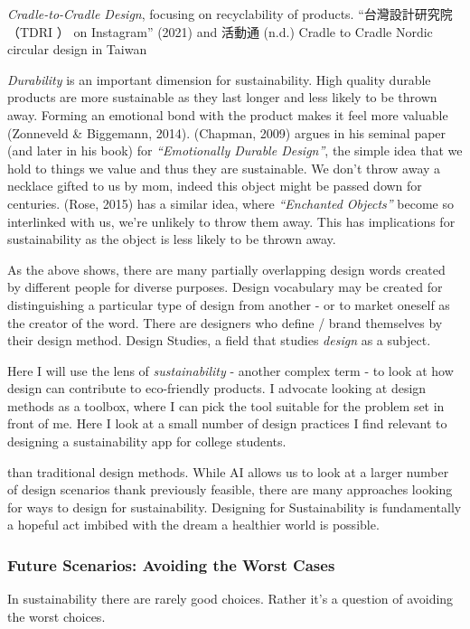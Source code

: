 \documentclass[
  letterpaper,
  DIV=11,
  numbers=noendperiod]{scrartcl}
\begin{document}
\emph{Cradle-to-Cradle Design}, focusing on recyclability of products.
{``台灣設計研究院（{TDRI} ） on {Instagram}''} (2021) and 活動通 (n.d.)
Cradle to Cradle Nordic circular design in Taiwan

\emph{Durability} is an important dimension for sustainability. High
quality durable products are more sustainable as they last longer and
less likely to be thrown away. Forming an emotional bond with the
product makes it feel more valuable (Zonneveld \& Biggemann, 2014).
(Chapman, 2009) argues in his seminal paper (and later in his book) for
\emph{``Emotionally Durable Design''}, the simple idea that we hold to
things we value and thus they are sustainable. We don't throw away a
necklace gifted to us by mom, indeed this object might be passed down
for centuries. (Rose, 2015) has a similar idea, where \emph{``Enchanted
Objects''} become so interlinked with us, we're unlikely to throw them
away. This has implications for sustainability as the object is less
likely to be thrown away.

As the above shows, there are many partially overlapping design words
created by different people for diverse purposes. Design vocabulary may
be created for distinguishing a particular type of design from another -
or to market oneself as the creator of the word. There are designers who
define / brand themselves by their design method. Design Studies, a
field that studies \emph{design} as a subject.

Here I will use the lens of \emph{sustainability} - another complex term
- to look at how design can contribute to eco-friendly products. I
advocate looking at design methods as a toolbox, where I can pick the
tool suitable for the problem set in front of me. Here I look at a small
number of design practices I find relevant to designing a sustainability
app for college students.

than traditional design methods. While AI allows us to look at a larger
number of design scenarios thank previously feasible, there are many
approaches looking for ways to design for sustainability. Designing for
Sustainability is fundamentally a hopeful act imbibed with the dream a
healthier world is possible.

\subsubsection{Future Scenarios: Avoiding the Worst
Cases}\label{future-scenarios-avoiding-the-worst-cases}

In sustainability there are rarely good choices. Rather it's a question
of avoiding the worst choices.
\end{document}
